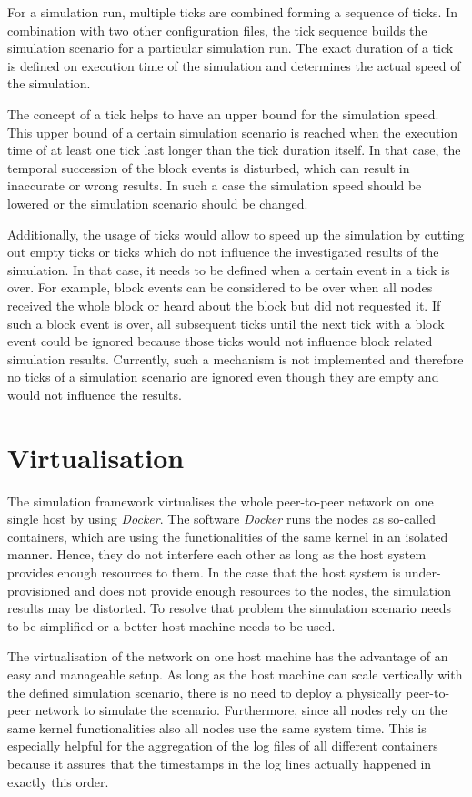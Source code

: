For a simulation run, multiple ticks are combined forming a sequence of ticks.
In combination with two other configuration files, the tick sequence builds the simulation scenario for a particular simulation run.
The exact duration of a tick is defined on execution time of the simulation and determines the actual speed of the simulation.

The concept of a tick helps to have an upper bound for the simulation speed.
This upper bound of a certain simulation scenario is reached when the execution time of at least one tick last longer than the tick duration itself.
In that case, the temporal succession of the block events is disturbed, which can result in inaccurate or wrong results.
In such a case the simulation speed should be lowered or the simulation scenario should be changed.

Additionally, the usage of ticks would allow to speed up the simulation by cutting out empty ticks or ticks which do not influence the investigated results of the simulation.
In that case, it needs to be defined when a certain event in a tick is over.
For example, block events can be considered to be over when all nodes received the whole block or heard about the block but did not requested it.
If such a block event is over, all subsequent ticks until the next tick with a block event could be ignored because those ticks would not influence block related simulation results.
Currently, such a mechanism is not implemented and therefore no ticks of a simulation scenario are ignored even though they are empty and would not influence the results.

\section{Virtualisation}
\label{chap:virtualisation}

The simulation framework virtualises the whole peer-to-peer network on one single host by using \textit{Docker}.
The software \textit{Docker} runs the nodes as so-called containers, which are using the functionalities of the same kernel in an isolated manner.
Hence, they do not interfere each other as long as the host system provides enough resources to them.
In the case that the host system is under-provisioned and does not provide enough resources to the nodes, the simulation results may be distorted.
To resolve that problem the simulation scenario needs to be simplified or a better host machine needs to be used.

The virtualisation of the network on one host machine has the advantage of an easy and manageable setup.
As long as the host machine can scale vertically with the defined simulation scenario, there is no need to deploy a physically peer-to-peer network to simulate the scenario.
Furthermore, since all nodes rely on the same kernel functionalities also all nodes use the same system time.
This is especially helpful for the aggregation of the log files of all different containers because it assures that the timestamps in the log lines actually happened in exactly this order.

